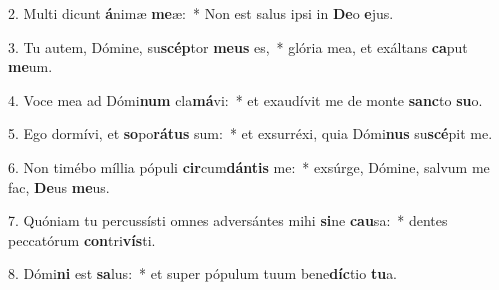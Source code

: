 2. Multi dicunt \textbf{á}nimæ \textbf{me}æ:~*  Non est salus ipsi in \textbf{De}o \textbf{e}jus.\

3. Tu autem, Dómine, su\textbf{scép}tor \textbf{me}\textbf{us} es,~*  glória mea, et exáltans \textbf{ca}put \textbf{me}um.\

4. Voce mea ad Dómi\textbf{num} cla\textbf{má}vi:~*  et exaudívit me de monte \textbf{sanc}to \textbf{su}o.\

5. Ego dormívi, et \textbf{so}po\textbf{rá}\textbf{tus} sum:~*  et exsurréxi, quia Dómi\textbf{nus} su\textbf{scé}pit me.\

6. Non timébo míllia pópuli \textbf{cir}cum\textbf{dán}\textbf{tis} me:~*  exsúrge, Dómine, salvum me fac, \textbf{De}us \textbf{me}us.\

7. Quóniam tu percussísti omnes adversántes mihi \textbf{si}ne \textbf{cau}sa:~*  dentes peccatórum \textbf{con}tri\textbf{vís}ti.\

8. Dómi\textbf{ni} est \textbf{sa}lus:~*  et super pópulum tuum bene\textbf{díc}tio \textbf{tu}a.\

